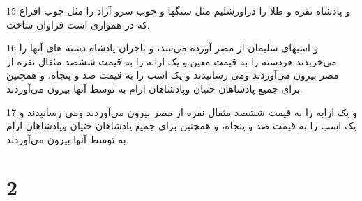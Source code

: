 \par 15 و پادشاه نقره و طلا را دراورشلیم مثل سنگها و چوب سرو آزاد را مثل چوب افراغ که در همواری است فراوان ساخت.
\par 16 و اسبهای سلیمان از مصر آورده می‌شد، و تاجران پادشاه دسته های آنها را می‌خریدند هردسته را به قیمت معین.و یک ارابه را به قیمت ششصد مثقال نقره از مصر بیرون می‌آوردند ومی رسانیدند و یک اسب را به قیمت صد و پنجاه، و همچنین برای جمیع پادشاهان حتیان وپادشاهان ارام به توسط آنها بیرون می‌آوردند.
\par 17 و یک ارابه را به قیمت ششصد مثقال نقره از مصر بیرون می‌آوردند ومی رسانیدند و یک اسب را به قیمت صد و پنجاه، و همچنین برای جمیع پادشاهان حتیان وپادشاهان ارام به توسط آنها بیرون می‌آوردند.
 
\chapter{2}

